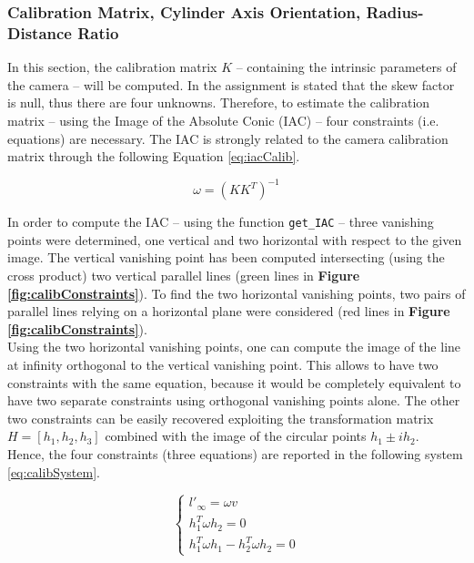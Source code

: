 \documentclass[12pt,a4paper]{article}
\begin{document}
\subsubsection{Calibration Matrix, Cylinder Axis Orientation, Radius-Distance Ratio}\label{sec:toRatioRadiusDistance}
In this section, the calibration matrix $K$ -- containing the intrinsic parameters of the camera --  will be computed. In the assignment is stated that the skew factor is null, thus there are four unknowns. Therefore, to estimate the calibration matrix -- using the Image of the Absolute Conic (IAC) -- four constraints (i.e. equations) are necessary. The IAC is strongly related to the camera calibration matrix through the following Equation \ref{eq:iacCalib}.

\begin{equation}
    \omega = (KK^T)^{-1}
    \label{eq:iacCalib}
\end{equation}
\bigskip

In order to compute the IAC -- using the function \verb|get_IAC| -- three vanishing points were determined, one vertical and two horizontal with respect to the given image. The vertical vanishing point has been computed intersecting (using the cross product) two vertical parallel lines (green lines in \textbf{Figure \ref{fig:calibConstraints}}). To find the two horizontal vanishing points, two pairs of parallel lines relying on a horizontal plane were considered (red lines in \textbf{Figure \ref{fig:calibConstraints}}).\\

Using the two horizontal vanishing points, one can compute the image of the line at infinity orthogonal to the vertical vanishing point. This allows to have two constraints with the same equation, because it would be completely equivalent to have two separate constraints using orthogonal vanishing points alone. The other two constraints can be easily recovered exploiting the transformation matrix $H = [h_1,h_2,h_3]$ combined with the image of the circular points $h_1 \pm ih_2$.\\

Hence, the four constraints (three equations) are reported in the following system \ref{eq:calibSystem}.

\begin{equation}
    \begin{cases}
        l'_\infty = \omega v\\
        h_1^T\omega h_2 = 0\\
        h_1^T\omega h_1 - h_2^T\omega h_2 = 0
    \end{cases}
    \label{eq:calibSystem}
\end{equation}
\end{document}

